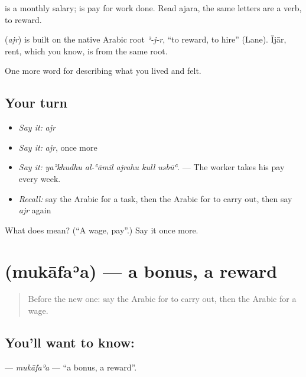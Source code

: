  is a monthly salary;  is pay for work done. Read ajara, the same letters are a verb, to reward.

\begin{cousinweb}
\textbf{} (\emph{ajr}) is built on the native Arabic root \emph{ʾ-j-r}, \textquotedblleft{}to reward, to hire\textquotedblright{} (Lane). Ījār, rent, which you know, is from the same root.
\end{cousinweb}

\begin{grammarlens}[title={What you've built}]
One more word for describing what you lived and felt.
\end{grammarlens}

\subsection*{Your turn}
\begin{itemize}
\raggedright
  \item \emph{Say it:} \emph{ajr}
  \item \emph{Say it:} \emph{ajr}, once more
  \item \emph{Say it:} \emph{yaʾkhudhu al-ʿāmil ajrahu kull usbūʿ.} — The worker takes his pay every week.
  \item \emph{Recall:} say the Arabic for a task, then the Arabic for to carry out, then say \emph{ajr} again
\end{itemize}

\begin{tcolorbox}[breakable,colback=teal!4,colframe=teal!35!black,title={Before you move on}]
What does  mean? (\textquotedblleft{}A wage, pay\textquotedblright{}.) Say it once more.
\end{tcolorbox}
\section[\texorpdfstring{\ar{مكافأة} (mukāfaʾa)}{مكافأة (mukāfaʾa)}]{ (mukāfaʾa) — a bonus, a reward}

\label{lesson:AR-C521-mukafaa}



\begin{quote}
Before the new one: say the Arabic for to carry out, then the Arabic for a wage.
\end{quote}

\subsection*{You'll want to know: }
\textbf{} — \emph{mukāfaʾa} — \textquotedblleft{}a bonus, a reward\textquotedblright{}.

